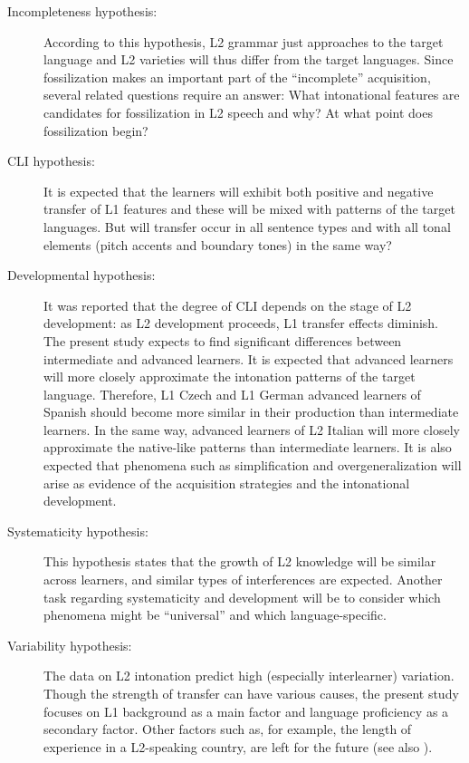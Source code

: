\begin{description}
\item[Incompleteness hypothesis:] According to this hypothesis, L2 grammar just approaches to the target language and L2 varieties will thus differ from the target languages. Since fossilization makes an important part of the “incomplete” acquisition, several related questions require an answer: What intonational features are candidates for fossilization in L2 speech and why? At what point does fossilization begin?

\item[CLI hypothesis:] It is expected that the learners will exhibit both positive and negative transfer of L1 features and these will be mixed with patterns of the target languages. But will transfer occur in all sentence types and with all tonal elements (pitch accents and boundary tones) in the same way?

\item[Developmental hypothesis:] It was reported that the degree of CLI depends on the stage of L2 development: as L2 development proceeds, L1 transfer effects diminish. The present study expects to find significant differences between intermediate and advanced learners. It is expected that advanced learners will more closely approximate the intonation patterns of the target language. Therefore, L1 Czech and L1 German advanced learners of Spanish should become more similar in their production than intermediate learners. In the same way, advanced learners of L2 Italian will more closely approximate the native-like patterns than intermediate learners. It is also expected that phenomena such as simplification and overgeneralization will arise as evidence of the acquisition strategies and the intonational development.

\item[Systematicity hypothesis:] This hypothesis states that the growth of L2 knowledge will be similar across learners, and similar types of interferences are expected. Another task regarding systematicity and development will be to consider which phenomena might be “universal” and which language-specific.

\item[Variability hypothesis:] The data on L2 intonation predict high (especially interlearner) variation. Though the strength of transfer can have various causes, the present study focuses on L1 background as a main factor and language proficiency as a secondary factor. Other factors such as, for example, the length of experience in a L2-speaking country, are left for the future (see also ).
\end{description}

